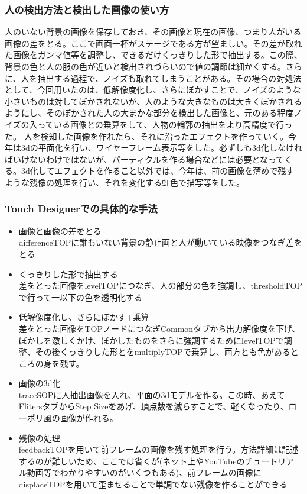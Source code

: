 \documentclass[dvipdfmx,jb5]{jreport}
\begin{document}
\subsubsection{人の検出方法と検出した画像の使い方}
人のいない背景の画像を保存しておき、その画像と現在の画像、つまり人がいる画像の差をとる。ここで画面一杯がステージである方が望ましい。その差が取れた画像をガンマ値等を調整し、できるだけくっきりした形で抽出する。この際、背景の色と人の服の色が近いと検出されづらいので値の調節は細かくする。さらに、人を抽出する過程で、ノイズも取れてしまうことがある。その場合の対処法として、今回用いたのは、低解像度化し、さらにぼかすことで、ノイズのような小さいものは対してぼかされないが、人のような大きなものは大きくぼかされるようにし、そのぼかされた人の大まかな部分を検出した画像と、元のある程度ノイズの入っている画像との乗算をして、人物の輪郭の抽出をより高精度で行った。
人を検知した画像を作れたら、それに沿ったエフェクトを作っていく。今年は3dの平面化を行い、ワイヤーフレーム表示等をした。必ずしも3d化しなければいけないわけではないが、パーティクルを作る場合などには必要となってくる。3d化してエフェクトを作ること以外では、今年は、前の画像を薄めで残すような残像の処理を行い、それを変化する虹色で描写等をした。


\subsubsection{Touch Designerでの具体的な手法}
\begin{itemize}
      \item 画像と画像の差をとる\\
            differenceTOPに誰もいない背景の静止画と人が動いている映像をつなぎ差をとる
      \item くっきりした形で抽出する\\
            差をとった画像をlevelTOPにつなぎ、人の部分の色を強調し、thresholdTOPで行って一以下の色を透明化する
      \item 低解像度化し、さらにぼかす+乗算\\
            差をとった画像をTOPノードにつなぎCommonタブから出力解像度を下げ、ぼかしを激しくかけ、ぼかしたものをさらに強調するためにlevelTOPで調整、その後くっきりした形とをmultiplyTOPで乗算し、両方とも色があるところの身を残す。
      \item 画像の3d化\\
            traceSOPに人抽出画像を入れ、平面の3dモデルを作る。この時、あえてFlitersタブからStep Sizeをあげ、頂点数を減らすことで、軽くなったり、ローポリ風の画像が作れる。
      \item 残像の処理\\
            feedbackTOPを用いて前フレームの画像を残す処理を行う。方法詳細は記述するのが難しいため、ここでは省くが(ネット上やYouTubeのチュートリアル動画等でわかりやすいのがいくつもある)、前フレームの画像にdisplaceTOPを用いて歪ませることで単調でない残像を作ることができる
\end{itemize}
\end{document}
